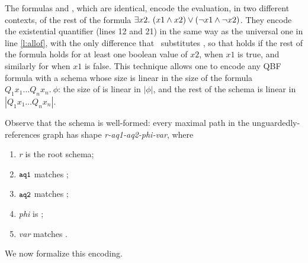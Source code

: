 The formulas  and  ,
which are identical, encode the evaluation,
in two different contexts, of the rest of the formula $\exists x2.\ (x1 \wedge x2) \vee (\neg x1 \wedge \neg x2)$.
They encode the existential quantifier (lines 12 and 21) in the same way as the universal one in line \ref{l:allof}, with the only difference that 
\qany\ substitutes \qall, so that
 holds if the rest of the formula holds for at least one boolean value of $x2$, when $x1$ is true, 
and similarly for  when $x1$ is false.
This technique allows one to encode any QBF formula with a schema whose size is linear in the size of the formula
$Q_1 x_1 \ldots Q_n x_n. \ \phi$:
the size of   is linear in $|\phi|$, and the rest of the schema is linear in $|Q_1 x_1 \ldots Q_n x_n|$.


Observe that the schema is well-formed:
every maximal path in the unguardedly-references graph has shape
\emph{r-aq1-aq2-phi-var},
where 
\begin{enumerate}
\item \emph{r} is the root schema;

\item$\mbox{\tt{\small aq1}}$ matches ;

\item$\mbox{\tt{\small aq2}}$ matches ;

\item \emph{phi} is ;

\item  \emph{var} matches .

\end{enumerate}

We now formalize this encoding.

